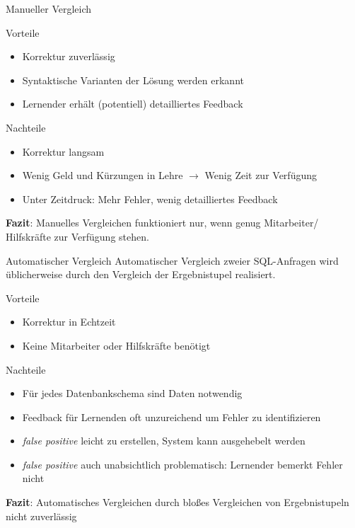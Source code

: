 \documentclass{beamer}
\begin{document}
\begin{frame}{Manueller Vergleich}
\begin{block}{Vorteile}
\begin{itemize}
\item Korrektur zuverlässig 
\item Syntaktische Varianten der Lösung werden erkannt
\item Lernender erhält (potentiell) detailliertes Feedback
\end{itemize}
\end{block}

\begin{alertblock}{Nachteile}
\begin{itemize}
\item Korrektur langsam
\item Wenig Geld und Kürzungen in Lehre $\to$ Wenig Zeit zur Verfügung
\item Unter Zeitdruck: Mehr Fehler, wenig detailliertes Feedback
\end{itemize}
\end{alertblock}

\textbf{Fazit}: Manuelles Vergleichen funktioniert nur, wenn genug Mitarbeiter/ Hilfskräfte zur Verfügung stehen.
\end{frame}

\begin{frame}{Automatischer Vergleich}
Automatischer Vergleich zweier SQL-Anfragen wird üblicherweise durch den Vergleich der Ergebnistupel realisiert.
\begin{block}{Vorteile}
\begin{itemize}
\item Korrektur in Echtzeit
\item Keine Mitarbeiter oder Hilfskräfte benötigt
\end{itemize}
\end{block}

\begin{alertblock}{Nachteile}
\begin{itemize}
\item Für jedes Datenbankschema sind Daten notwendig
\item Feedback für Lernenden oft unzureichend um Fehler zu identifizieren
\item \textit{false positive} leicht zu erstellen, System kann ausgehebelt werden
\item \textit{false positive} auch unabsichtlich problematisch: Lernender bemerkt Fehler nicht
\end{itemize}
\end{alertblock}

\textbf{Fazit}: Automatisches Vergleichen durch bloßes Vergleichen von Ergebnistupeln nicht zuverlässig
\end{frame}
\end{document}
